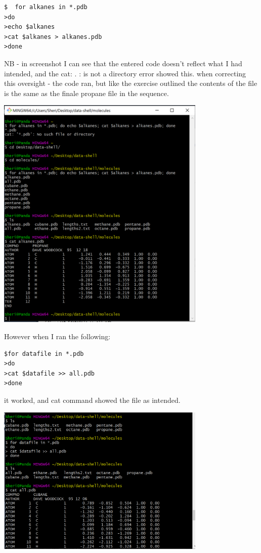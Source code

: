 \documentclass{article}
\begin{document}
\begin{verbatim}
$  for alkanes in *.pdb
>do
>echo $alkanes
>cat $alkanes > alkanes.pdb
>done
\end{verbatim}

NB - in screenshot I can see that the entered code doesn't reflect what I had intended, and the cat: . : is not a directory error showed this.
when correcting this oversight - the code ran, but like the exercise outlined the contents of the file is the same as the finale propane file in the sequence.

\includegraphics[width=10cm]{Images/GitBash_048.PNG}

However when I ran the following:

\begin{verbatim}
$for datafile in *.pdb
>do
>cat $datafile >> all.pdb
>done
\end{verbatim}

it worked, and cat command showed the file as intended.

\includegraphics[width=10cm]{Images/GitBash_047.PNG}
\end{document}
